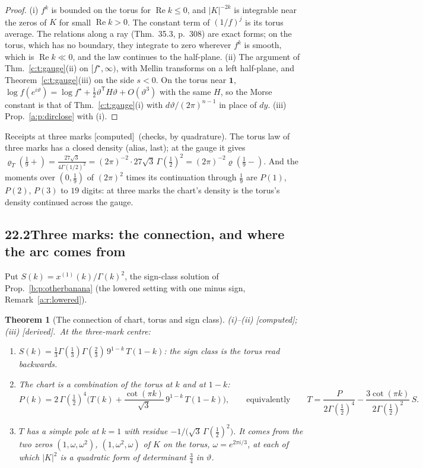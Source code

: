 \documentclass[11pt]{article}
\newcommand{\one}{\mathbf 1}
\theoremstyle{plain}
\newtheorem{theorem}[proposition]{Theorem}
\theoremstyle{definition}
\theoremstyle{remark}
\newcommand{\derived}{\textup{[derived]}}
\newcommand{\computed}{\textup{[computed]}}
\begin{document}
\begin{proof}
(i) $f^k$ is bounded on the torus for $\operatorname{Re}k\le0$, and $|K|^{-2k}$ is integrable near the zeros of $K$ for small $\operatorname{Re}k>0$. The constant term of $(1/f)^j$ is its torus average. The relations along a ray (Thm.~35.3, p.~308) are exact forms; on the torus, which has no boundary, they integrate to zero wherever $f^k$ is smooth, which is $\operatorname{Re}k\ll0$, and the law continues to the half-plane. (ii) The argument of Thm.~\ref{c:t:gauge}(ii) on $[f^\star,\infty)$, with Mellin transforms on a left half-plane, and Theorem~\ref{c:t:gauge}(iii) on the side $s<0$. On the torus near $\one$, $\log f(e^{i\vartheta})=\log f^\star+\frac12\vartheta^{\mathsf T}H\vartheta+O(\vartheta^3)$ with the same $H$, so the Morse constant is that of Thm.~\ref{c:t:gauge}(i) with $d\vartheta/(2\pi)^{n-1}$ in place of $dy$. (iii) Prop.~\ref{a:p:dirclose} with (i).
\end{proof}

\noindent Receipts at three marks \computed\ (checks, by quadrature). The torus law of three marks has a closed density (alias, last); at the gauge it gives $\varrho_T(\frac19+)=\frac{27\sqrt3}{4\Gamma(1/2)^2}=(2\pi)^{-2}\cdot27\sqrt3\,\Gamma(\frac12)^2=(2\pi)^{-2}\varrho(\frac19-)$. And the moments over $(0,\frac19)$ of $(2\pi)^2$ times its continuation through $\frac19$ are $P(1)$, $P(2)$, $P(3)$ to $19$ digits: at three marks the chart's density is the torus's density continued across the gauge.

\subsection*{22.2\quad Three marks: the connection, and where the arc comes from}

Put $S(k)=x^{(1)}(k)/\Gamma(k)^2$, the sign-class solution of Prop.~\ref{b:p:otherbanana} (the lowered setting with one minus sign, Remark~\ref{a:r:lowered}).

\begin{theorem}[The connection of chart, torus and sign class]\label{d:t:connection}(i)--(ii) \computed; (iii) \derived.\
At the three-mark centre:
\begin{enumerate}[label=(\roman*)]
\item $S(k)=\frac13\Gamma(\frac13)\Gamma(\frac23)\,9^{1-k}\,T(1-k)$: the sign class is the torus read backwards.
\item The chart is a combination of the torus at $k$ and at $1-k$:
\[
P(k)=2\,\Gamma(\tfrac12)^4\Big(T(k)+\frac{\cot(\pi k)}{\sqrt3}\,9^{1-k}\,T(1-k)\Big),\qquad\text{equivalently}\qquad T=\frac{P}{2\Gamma(\frac12)^4}-\frac{3\cot(\pi k)}{2\Gamma(\frac12)^2}\,S .
\]
\item $T$ has a simple pole at $k=1$ with residue $-1/\big(\sqrt3\,\Gamma(\frac12)^2\big)$. It comes from the two zeros $(1,\omega,\omega^2)$, $(1,\omega^2,\omega)$ of $K$ on the torus, $\omega=e^{2\pi i/3}$, at each of which $|K|^2$ is a quadratic form of determinant $\frac34$ in $\vartheta$.
\end{enumerate}
\end{theorem}
\end{document}
